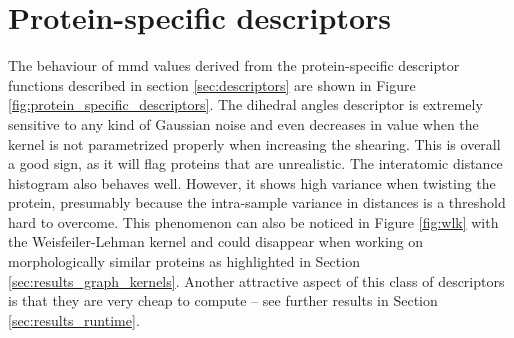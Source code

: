 \section{Protein-specific descriptors}\label{sec:results_protein_descriptors}

The behaviour of \acrshort{mmd} values derived from the protein-specific descriptor
functions described in section \ref{sec:descriptors} are shown in Figure
\ref{fig:protein_specific_descriptors}. The dihedral angles descriptor is
extremely sensitive to any kind of Gaussian noise and even decreases in value
when the kernel is not parametrized properly when increasing the shearing. This
is overall a good sign, as it will flag proteins that are unrealistic. The
interatomic distance histogram also behaves well. However, it shows high
variance when twisting the protein, presumably because the intra-sample variance
in distances is a threshold hard to overcome. This phenomenon can also be
noticed in Figure \ref{fig:wlk} with the Weisfeiler-Lehman kernel and could
disappear when working on morphologically similar proteins as highlighted in
Section \ref{sec:results_graph_kernels}. Another attractive aspect of this class
of descriptors is that they are very cheap to compute -- see further results in
Section \ref{sec:results_runtime}.


